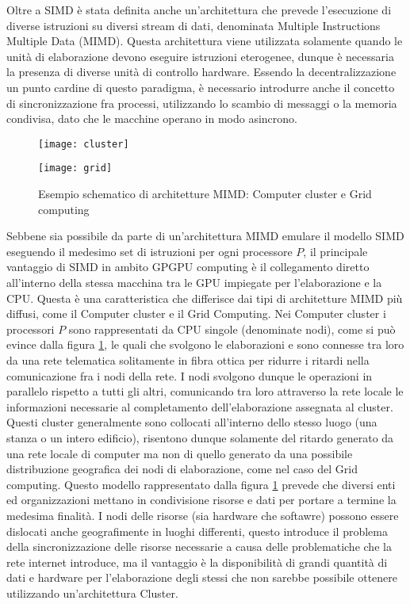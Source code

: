 Oltre a SIMD è stata definita anche un'architettura che prevede
l'esecuzione di diverse istruzioni su diversi stream di dati, denominata
Multiple Instructions Multiple Data (MIMD)\cite{duncan1990survey}.
Questa architettura viene utilizzata solamente quando le unità di elaborazione
devono eseguire istruzioni eterogenee, dunque è necessaria la presenza
di diverse unità di controllo hardware.
Essendo la decentralizzazione un punto cardine
di questo paradigma, è necessario introdurre anche il concetto di
sincronizzazione fra processi, utilizzando lo scambio di messaggi o
la memoria condivisa, dato che le macchine operano in modo asincrono.
\begin{figure}[t]
    \begin{minipage}[b]{.5\linewidth}
        \centering
        \texttt{[image: cluster]}
    \end{minipage}
    \begin{minipage}[b]{.5\linewidth}
        \centering
        \texttt{[image: grid]}
    \end{minipage}
    \caption{Esempio schematico di architetture MIMD:
        Computer cluster e Grid computing}
    \label{fig:cluster-grid}
\end{figure}
Sebbene sia possibile da parte di un'architettura MIMD emulare il modello
SIMD eseguendo il medesimo set di istruzioni per ogni processore $P$, il
principale vantaggio di SIMD in ambito GPGPU computing è il collegamento diretto
all'interno della stessa macchina tra le GPU impiegate per l'elaborazione e la 
CPU. Questa è una caratteristica che differisce dai tipi di
architetture MIMD più diffusi, come il Computer cluster e il Grid Computing.
Nei Computer cluster i processori $P$ sono rappresentati da CPU singole
(denominate nodi), come si può evince dalla figura \ref{fig:cluster-grid},
le quali che svolgono le elaborazioni e sono connesse tra loro da una
rete telematica solitamente in fibra
ottica per ridurre i ritardi nella comunicazione fra i nodi della rete.
I nodi svolgono dunque le operazioni in parallelo rispetto a tutti gli altri,
comunicando tra loro attraverso la rete locale le informazioni necessarie al
completamento dell'elaborazione assegnata al cluster. Questi cluster
generalmente sono collocati all'interno dello stesso luogo
(una stanza o un intero edificio), risentono dunque solamente del ritardo generato
da una rete locale di computer ma non di quello generato da una
possibile distribuzione geografica dei nodi di elaborazione, come nel caso
del Grid computing. Questo modello rappresentato dalla figura
\ref{fig:cluster-grid} 
prevede che diversi enti ed organizzazioni mettano in condivisione risorse e
dati per portare a termine la medesima finalità.
I nodi delle risorse (sia hardware che softawre) possono essere
dislocati anche geografimente in luoghi differenti, questo introduce il problema
della sincronizzazione delle risorse necessarie a causa delle problematiche
che la rete internet introduce, ma il vantaggio è la disponibilità di grandi
quantità di dati e hardware per l'elaborazione degli stessi che non sarebbe
possibile ottenere utilizzando un'architettura Cluster.

